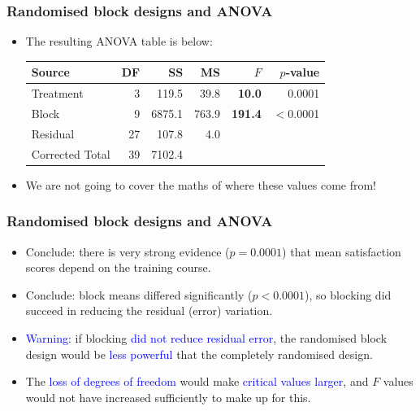 \documentclass[12pt,xcolor=dvipsnames,handout,mathserif,aspectratio=169]{beamer}
\newcommand{\tc}{\textcolor}
\begin{document}
\begin{frame}
\frametitle{Randomised block designs and ANOVA}
\begin{itemize}
\item The resulting ANOVA table is below:
\vspace*{0.3cm}
\begin{center}
{\small{
\begin{tabular}{lrrrrr}\hline
Source& DF& SS &MS & $F$ & $p$-value\\ \hline
Treatment& 3& 119.5& 39.8& \bf{10.0}& 0.0001\\
Block& 9& 6875.1& 763.9 & \bf{191.4}&$<$0.0001\\
Residual& 27& 107.8& 4.0&&\\ \hline
Corrected Total& 39& 7102.4&&&\\\hline
\end{tabular}}}
\end{center}
\vspace*{0.3cm}
\item We are not going to cover the maths of where these values come from!
\end{itemize}
\end{frame}

\begin{frame}
\frametitle{Randomised block designs and ANOVA}
\begin{itemize}
\item Conclude: there is very strong evidence ($p = 0.0001$) that mean satisfaction scores depend on the training course.
\vspace{0.2cm}
\item Conclude: block means differed significantly ($p < 0.0001$), so blocking did succeed in reducing the
residual (error) variation.
\vspace*{0.3cm}
\item \tc{blue}{Warning}: if blocking \tc{blue}{did not reduce residual error}, the randomised block design would be \tc{blue}{less powerful} that the completely randomised design.
\vspace*{0.2cm}
\item The \tc{blue}{loss of degrees of freedom} would make \tc{blue}{critical values larger}, and $F$ values would not have increased sufficiently to make up for this.
\end{itemize}
\end{frame}
\end{document}
